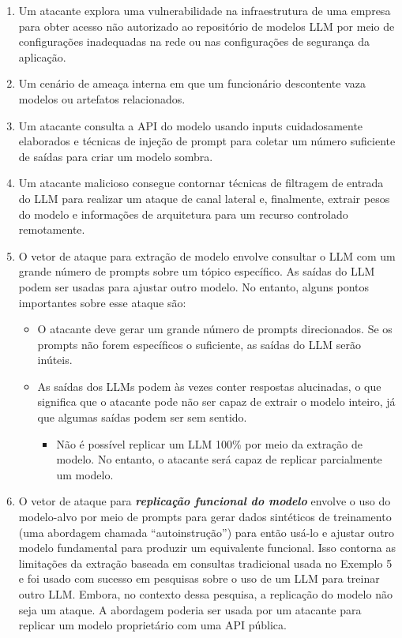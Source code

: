 \documentclass[
]{article}
\providecommand{\tightlist}{%
  \setlength{\itemsep}{0pt}\setlength{\parskip}{0pt}}
\begin{document}
\begin{enumerate}
\def\labelenumi{\arabic{enumi}.}
\tightlist
\item
  Um atacante explora uma vulnerabilidade na infraestrutura de uma
  empresa para obter acesso não autorizado ao repositório de modelos LLM
  por meio de configurações inadequadas na rede ou nas configurações de
  segurança da aplicação.
\item
  Um cenário de ameaça interna em que um funcionário descontente vaza
  modelos ou artefatos relacionados.
\item
  Um atacante consulta a API do modelo usando inputs cuidadosamente
  elaborados e técnicas de injeção de prompt para coletar um número
  suficiente de saídas para criar um modelo sombra.
\item
  Um atacante malicioso consegue contornar técnicas de filtragem de
  entrada do LLM para realizar um ataque de canal lateral e, finalmente,
  extrair pesos do modelo e informações de arquitetura para um recurso
  controlado remotamente.
\item
  O vetor de ataque para extração de modelo envolve consultar o LLM com
  um grande número de prompts sobre um tópico específico. As saídas do
  LLM podem ser usadas para ajustar outro modelo. No entanto, alguns
  pontos importantes sobre esse ataque são:

  \begin{itemize}
  \tightlist
  \item
    O atacante deve gerar um grande número de prompts direcionados. Se
    os prompts não forem específicos o suficiente, as saídas do LLM
    serão inúteis.
  \item
    As saídas dos LLMs podem às vezes conter respostas alucinadas, o que
    significa que o atacante pode não ser capaz de extrair o modelo
    inteiro, já que algumas saídas podem ser sem sentido.

    \begin{itemize}
    \tightlist
    \item
      Não é possível replicar um LLM 100\% por meio da extração de
      modelo. No entanto, o atacante será capaz de replicar parcialmente
      um modelo.
    \end{itemize}
  \end{itemize}
\item
  O vetor de ataque para \textbf{\emph{replicação funcional do modelo}}
  envolve o uso do modelo-alvo por meio de prompts para gerar dados
  sintéticos de treinamento (uma abordagem chamada ``autoinstrução'')
  para então usá-lo e ajustar outro modelo fundamental para produzir um
  equivalente funcional. Isso contorna as limitações da extração baseada
  em consultas tradicional usada no Exemplo 5 e foi usado com sucesso em
  pesquisas sobre o uso de um LLM para treinar outro LLM. Embora, no
  contexto dessa pesquisa, a replicação do modelo não seja um ataque. A
  abordagem poderia ser usada por um atacante para replicar um modelo
  proprietário com uma API pública.
\end{enumerate}
\end{document}
